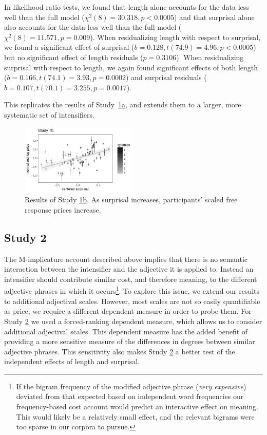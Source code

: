 \documentclass[10pt,letterpaper]{article}
\newcommand{\w}[1]{\emph{#1}}
\begin{document}
In likelihood ratio tests, we found that length alone accounts for the data less well than the full model ($\chi^2(8)=30.318,p<0.0005$) and that surprisal alone also accounts for the data less well than the full model ($\chi^2(8)=11.571,p=0.009$).
When residualizing length with respect to surprisal, we found a significant effect of surprisal ($b=0.128,t(74.9)=4.96,p<0.0005$) but no significant effect of length residuals ($p=0.3106$).
When residualizing surprisal with respect to length, we again found significant effects of both length ($b=0.166,t(74.1)=3.93,p=0.0002$) and surprisal residuals ($b=0.107,t(70.1)=3.255,p=0.0017$).

This replicates the results of Study~\hyperref[sec:study1a]{1a}, and extends them to a larger, more systematic set of intensifiers.

\begin{figure}[ht]
\begin{center}
\includegraphics[width=0.5\textwidth]{images/plot_study1b.pdf}
\end{center}
\caption{Results of Study \hyperref[sec:study1b]{1b}. As surprisal increases, participants' scaled free response prices increase.} 
\label{fig:plot_study1b}
\end{figure}

\subsection{Study 2 \label{sec:study2}}

The M-implicature account described above implies that there is no semantic interaction between the intensifier and the adjective it is applied to.
Instead an intensifier should contribute similar cost, and therefore meaning, to the different adjective phrases in which it occurs\footnote{If the bigram frequency of the modified adjective phrase (\w{very expensive}) deviated from that expected based on independent word frequencies our frequency-based cost account would predict an interactive effect on meaning.
This would likely be a relatively small effect, and the relevant bigrams were too sparse in our corpora to pursue.}.
To explore this issue, we extend our results to additional adjectival scales.
However, most scales are not so easily quantifiable as price; we require a different dependent measure in order to probe them.
For Study \hyperref[sec:study2]{2} we used a forced-ranking dependent measure, which allows us to consider additional adjectival scales.
This dependent measure has the added benefit of providing a more sensitive measure of the differences in degrees between similar adjective phrases.
This sensitivity also makes Study \hyperref[sec:study2]{2} a better test of the independent effects of length and surprisal.
\end{document}
